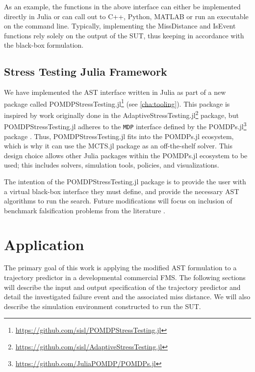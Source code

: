 As an example, the functions in the above interface can either be implemented directly in Julia or can call out to C++, Python, MATLAB\textsuperscript{\textregistered} or run an executable on the command line. Typically, implementing the {\sc MissDistance} and {\sc IsEvent} functions rely solely on the output of the SUT, thus keeping in accordance with the black-box formulation.


\subsection{Stress Testing Julia Framework}
We have implemented the AST interface written in Julia as part of a new package called POMDPStressTesting.jl\footnote{\url{https://github.com/sisl/POMDPStressTesting.jl}} (see \cref{cha:tooling}).
This package is inspired by work originally done in the AdaptiveStressTesting.jl\footnote{\url{https://github.com/sisl/AdaptiveStressTesting.jl}} package, but POMDPStressTesting.jl adheres to the \texttt{MDP} interface defined by the POMDPs.jl\footnote{\url{https://github.com/JuliaPOMDP/POMDPs.jl}} package  \cite{pomdps_jl}.
Thus, POMDPStressTesting.jl fits into the POMDPs.jl ecosystem, which is why it can use the MCTS.jl package as an off-the-shelf solver.
This design choice allows other Julia packages within the POMDPs.jl ecosystem to be used; this includes solvers, simulation tools, policies, and visualizations.


The intention of the POMDPStressTesting.jl package is to provide the user with a virtual black-box interface they must define, and provide the necessary AST algorithms to run the search. Future modifications will focus on inclusion of benchmark falsification problems from the literature  \cite{arch_comp}.



\section{Application}
\label{sec:ast_application}

The primary goal of this work is applying the modified AST formulation to a trajectory predictor in a developmental commercial FMS.
The following sections will describe the input and output specification of the trajectory predictor and detail the investigated failure event and the associated miss distance.
We will also describe the simulation environment constructed to run the SUT.




